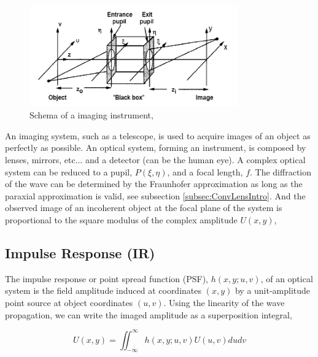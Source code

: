 \begin{figure}
\begin{center}
\includegraphics[width=0.8\textwidth,angle=0]{Figures/ImagingInstrumentGenSchema}
\decoRule
\caption{Schema of a imaging instrument, \citep[Chapter 6.1]{goodman_1968}}
\label{fig:ImagingInstrumentGenSchema}
\end{center}
\end{figure}

An imaging system, such as a telescope, is used to acquire images of an object as perfectly as possible. An optical system,  forming an instrument, is composed by lenses, mirrors, etc... and a detector (can be the human eye). A complex optical system can be reduced to a pupil, $P(\xi,\eta)$, and a focal length, $f$. The diffraction of the wave can be determined by the Fraunhofer approximation as long as the paraxial approximation is valid, see subsection \ref{subsec:ConvLensIntro}. And the observed image of an incoherent object at the focal plane of the system is proportional to the square modulus of the complex amplitude $U(x,y)$,


\subsection{Impulse Response (IR)}
\label{subsec:IR} 

The impulse response or point spread function (PSF), $h(x,y;u,v)$, of an optical system is  the field amplitude induced at coordinates $(x,y)$ by a unit-amplitude point source at object coordinates $(u,v)$. Using the linearity of the wave propagation, we can write the imaged amplitude as a superposition integral,

\begin{equation}
U(x,y) = \iint_{-\infty}^{\infty} h(x,y;u,v)U(u,v)dudv
\label{eqt:superpositionIntegral}
\end{equation}


